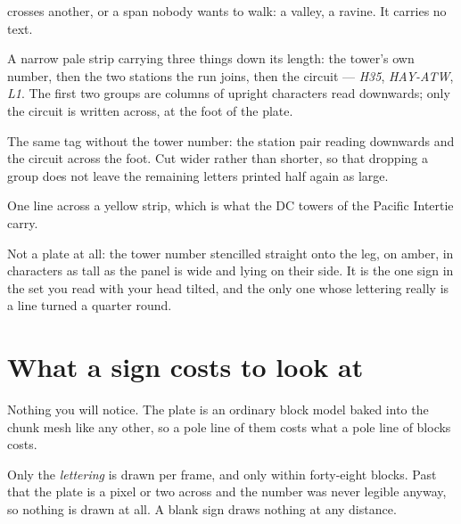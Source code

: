 \begin{description}
      crosses another, or a span nobody wants to walk: a valley, a ravine. It carries no text.
\item[Tower Identifier (tall)] A narrow pale strip carrying three things down its length: the
      tower's own number, then the two stations the run joins, then the circuit --- \emph{H35},
      \emph{HAY-ATW}, \emph{L1}. The first two groups are columns of upright characters read
      downwards; only the circuit is written across, at the foot of the plate.
\item[Tower Identifier (short)] The same tag without the tower number: the station pair reading
      downwards and the circuit across the foot. Cut wider rather than shorter, so that dropping a
      group does not leave the remaining letters printed half again as large.
\item[Tower Identifier (horizontal)] One line across a yellow strip, which is what the DC towers of
      the Pacific Intertie carry.
\item[Tower Number (painted panel)] Not a plate at all: the tower number stencilled straight onto
      the leg, on amber, in characters as tall as the panel is wide and lying on their side. It is
      the one sign in the set you read with your head tilted, and the only one whose lettering
      really is a line turned a quarter round.
\end{description}

\section{What a sign costs to look at}

Nothing you will notice. The plate is an ordinary block model baked into the chunk mesh like any
other, so a pole line of them costs what a pole line of blocks costs.

Only the \emph{lettering} is drawn per frame, and only within forty-eight blocks. Past that the
plate is a pixel or two across and the number was never legible anyway, so nothing is drawn at all.
A blank sign draws nothing at any distance.
